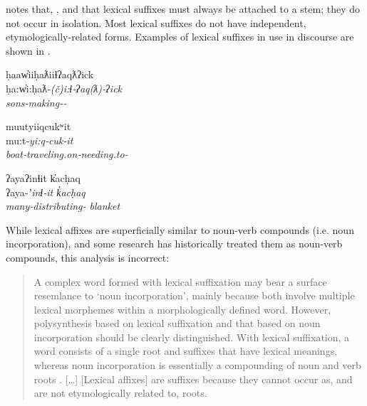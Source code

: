 \noindent \textcite[18]{Nakayama2001} notes that, , and that lexical suffixes must always be attached to a stem; they do not occur in isolation. Most lexical suffixes do not have independent, etymologically-related forms. Examples of lexical suffixes in use in discourse are shown in .

\begin{exe}

  \ex\label{ex:3.6}

  \begin{xlist}

    \ex\label{ex:3.6a}
    \glll ḥaaw̓iiḥaƛiiɬʔaqƛʔick\\
          ḥa:w̓i:ḥaƛ‑\em{(č)i:ɬ}‑ʔaq(ƛ)‑ʔick\\
          sons‑\em{making}‑‑\\

    \ex\label{ex:3.6b}
    \glll muutyiiqcukʷit\\
          mu:t‑\em{yi:q}‑cuk‑it\\
          boat‑\em{traveling.on}‑needing.to‑\\

    \clearpage

    \ex\label{ex:3.6c}
    \glll ʔayaʔinɬit k̓acḥaq\\
          ʔaya‑\em{ʼinɬ}‑it                k̓acḥaq\\
          many‑\em{distributing}‑ blanket\\

  \end{xlist}

\end{exe}

\noindent While lexical affixes are superficially similar to noun-verb compounds (i.e. noun incorporation), and some research has historically treated them as noun-verb compounds, this analysis is incorrect:

\blockquote[{\cite[18]{Nakayama2001}}]{A complex word formed with lexical suffixation may bear a surface resemlance to \enquote*{noun incorporation}, mainly because both involve multiple lexical morphemes within a morphologically defined word. However, polysynthesis based on lexical suffixation and that based on noun incorporation should be clearly distinguished. With lexical suffixation, a word consists of a single root and suffixes that have lexical meanings, whereas noun incorporation is essentially a compounding of noun and verb roots . […] [Lexical affixes] are suffixes because they cannot occur as, and are not etymologically related to, roots.}

